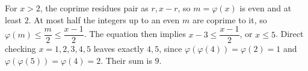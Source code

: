 For $x>2$, the coprime residues pair as $r,x-r$, so $m=\varphi(x)$ is even and at least $2$. At most half the integers up to an even $m$ are coprime to it, so $\varphi(m)\le\dfrac{m}{2}\le\dfrac{x-1}{2}$. The equation then implies $x-3\le\dfrac{x-1}{2}$, or $x\le5$. Direct checking $x=1,2,3,4,5$ leaves exactly $4,5$, since $\varphi(\varphi(4))=\varphi(2)=1$ and $\varphi(\varphi(5))=\varphi(4)=2$. Their sum is $\boxed9$.
